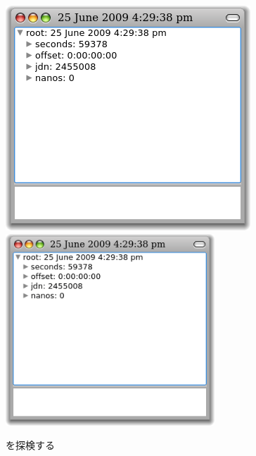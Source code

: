 \documentclass[a4paper,10pt,twoside]{book}
\begin{document}
\begin{figure}[tbp]
\begin{minipage}{0.48\textwidth}
	\begin{center}
	\ifluluelse
		{\includegraphics[width=\textwidth]{exploreTimeStampNow}}
		{\includegraphics[width=0.7\textwidth]{exploreTimeStampNow}}
	\end{center}
	\caption{  を探検する}
\end{minipage}
\hfill
\begin{minipage}{0.48\textwidth}
	\begin{center}
	\ifluluelse

\end{center}
\end{minipage}
\end{figure}
\end{document}
